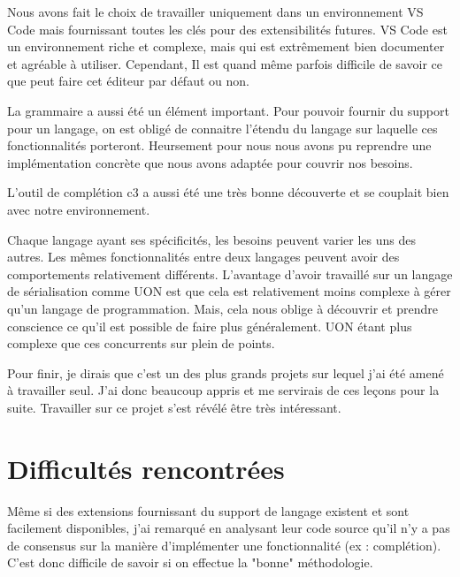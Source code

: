 \documentclass[
    iict, %
    il, %
]{heig-tb}
\begin{document}
Nous avons fait le choix de travailler uniquement dans un environnement VS Code mais fournissant toutes les clés pour des extensibilités futures.
VS Code est un environnement riche et complexe, mais qui est extrêmement bien documenter et agréable à utiliser.
Cependant, Il est quand même parfois difficile de savoir ce que peut faire cet éditeur par défaut ou non.

La grammaire a aussi été un élément important.
Pour pouvoir fournir du support pour un langage, on est obligé de connaitre l'étendu du langage sur laquelle ces fonctionnalités porteront.
Heursement pour nous nous avons pu reprendre une implémentation concrète que nous avons adaptée pour couvrir nos besoins.

L'outil de complétion c3 a aussi été une très bonne découverte et se couplait bien avec notre environnement.

Chaque langage ayant ses spécificités, les besoins peuvent varier les uns des autres.
Les mêmes fonctionnalités entre deux langages peuvent avoir des comportements relativement différents.
L'avantage d'avoir travaillé sur un langage de sérialisation comme UON est que cela est relativement moins complexe à gérer qu'un langage de programmation.
Mais, cela nous oblige à découvrir et prendre conscience ce qu'il est possible de faire plus généralement.
UON étant plus complexe que ces concurrents sur plein de points.

Pour finir, je dirais que c'est un des plus grands projets sur lequel j'ai été amené à travailler seul.
J'ai donc beaucoup appris et me servirais de ces leçons pour la suite. Travailler sur ce projet s'est révélé être très intéressant.


\section{Difficultés rencontrées}


Même si des extensions fournissant du support de langage existent et sont facilement disponibles, j'ai remarqué en analysant leur code source qu'il n'y a pas de consensus sur la manière d'implémenter une fonctionnalité (ex : complétion).
C'est donc difficile de savoir si on effectue la "bonne" méthodologie.
\end{document}
